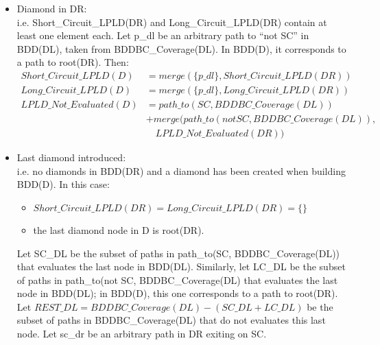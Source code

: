 \documentclass[a4paper,12pt,twoside]{article}
\begin{document}
\begin{description}
\begin{itemize}
  \item Diamond in DR:\\
    i.e. Short\_Circuit\_LPLD(DR) and Long\_Circuit\_LPLD(DR) contain at least
    one element each.
    Let p\_dl be an arbitrary path to ``not SC'' in BDD(DL), taken from
    BDDBC\_Coverage(DL). In BDD(D), it corresponds to a path to root(DR).
    Then:
    \begin{align*}
    Short\_Circuit\_LPLD(D) & = merge(\{p\_dl\}, Short\_Circuit\_LPLD(DR))\\
    Long\_Circuit\_LPLD(D)  & = merge(\{p\_dl\}, Long\_Circuit\_LPLD(DR))\\
    LPLD\_Not\_Evaluated(D) & = path\_to(SC, BDDBC\_Coverage(DL))\\
                          & + merge(path\_to(not SC, BDDBC\_Coverage(DL)),\\
                          & \quad  LPLD\_Not\_Evaluated(DR))
    \end{align*}

  \item Last diamond introduced:\\
    i.e. no diamonds in BDD(DR) and a diamond has been created when building
    BDD(D). In this case:
    \begin{itemize}
    \item $Short\_Circuit\_LPLD(DR) = Long\_Circuit\_LPLD(DR) = \{\}$
    \item the last diamond node in D is root(DR).
    \end{itemize}

    Let SC\_DL be the subset of paths in path\_to(SC,
    BDDBC\_Coverage(DL)) that evaluates the last node in BDD(DL).
    Similarly, let LC\_DL be the subset of paths in path\_to(not SC,
    BDDBC\_Coverage(DL) that evaluates the last node in BDD(DL); in
    BDD(D), this one corresponds to a path to root(DR).  Let $REST\_DL
    = BDDBC\_Coverage(DL) - (SC\_DL + LC\_DL)$ be the subset of paths
    in BDDBC\_Coverage(DL) that do not evaluates this last node.  Let
    sc\_dr be an arbitrary path in DR exiting on SC.


\end{itemize}
\end{description}
\end{document}
